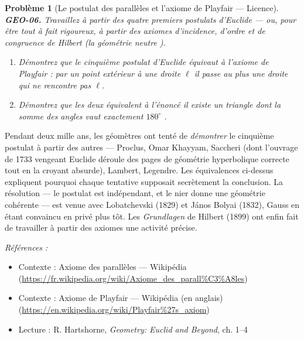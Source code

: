 \documentclass[11pt]{article}
\newtheorem{problem}{Problème}
\newenvironment{refs}{\par\small\noindent\emph{Références :}\begin{itemize}\setlength\itemsep{0pt}}{\end{itemize}\normalsize}
\begin{document}
\begin{problem}[{Le postulat des parallèles et l'axiome de Playfair --- Licence}]
\textbf{GEO-06.} Travaillez à partir des quatre premiers postulats d'Euclide --- ou, pour être
tout à fait rigoureux, à partir des axiomes d'incidence, d'ordre et de congruence de Hilbert
(la \og{} géométrie neutre \fg{}).
\begin{enumerate}
\item[(a)] Démontrez que le cinquième postulat d'Euclide équivaut à l'axiome de Playfair : par un
point extérieur à une droite $ \ell $ il passe au plus une droite qui ne rencontre pas
$ \ell $.
\item[(b)] Démontrez que les deux équivalent à l'énoncé \og{} il existe un triangle dont la somme des
angles vaut exactement $ 180^\circ $ \fg{}.
\end{enumerate}

\end{problem}

\noindent Pendant deux mille ans, les géomètres ont tenté de \textit{démontrer} le cinquième
postulat à partir des autres --- Proclus, Omar Khayyam, Saccheri (dont l'ouvrage de 1733 \og{} vengeant
Euclide \fg{} déroule des pages de géométrie hyperbolique correcte tout en la croyant absurde),
Lambert, Legendre. Les équivalences ci-dessus expliquent pourquoi chaque tentative supposait
secrètement la conclusion. La résolution --- le postulat est indépendant, et le nier donne une
géométrie cohérente --- est venue avec Lobatchevski (1829) et János Bolyai (1832), Gauss en étant
convaincu en privé plus tôt. Les \textit{Grundlagen} de Hilbert (1899) ont enfin fait de
\og{} travailler à partir des axiomes \fg{} une activité précise.

\begin{refs}
\item Contexte : Axiome des parallèles --- Wikipédia (\url{https://fr.wikipedia.org/wiki/Axiome_des_parall%C3%A8les})
\item Contexte : Axiome de Playfair --- Wikipédia (en anglais) (\url{https://en.wikipedia.org/wiki/Playfair%27s_axiom})
\item Lecture : R. Hartshorne, \textit{Geometry: Euclid and Beyond}, ch. 1--4
\end{refs}

\bigskip
\end{document}
